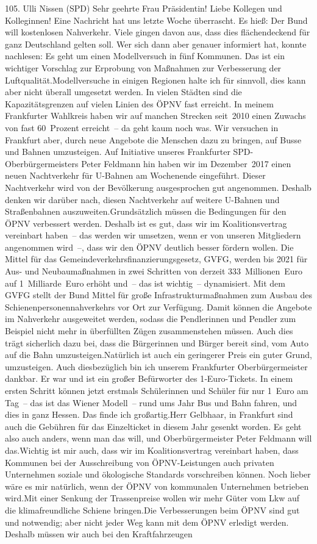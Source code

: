 \documentclass{article}
\begin{document}
	105. Ulli Nissen (SPD) Sehr geehrte Frau Präsidentin! Liebe Kollegen und Kolleginnen! Eine Nachricht hat uns letzte Woche überrascht. Es hieß: Der Bund will kostenlosen Nahverkehr. Viele gingen davon aus, dass dies flächendeckend für ganz Deutschland gelten soll. Wer sich dann aber genauer informiert hat, konnte nachlesen: Es geht um einen Modellversuch in fünf Kommunen. Das ist ein wichtiger Vorschlag zur Erprobung von Maßnahmen zur Verbesserung der Luftqualität.Modellversuche in einigen Regionen halte ich für sinnvoll, dies kann aber nicht überall umgesetzt werden. In vielen Städten sind die Kapazitätsgrenzen auf vielen Linien des ÖPNV fast erreicht. In meinem Frankfurter Wahlkreis haben wir auf manchen Strecken seit 2010 einen Zuwachs von fast 60 Prozent erreicht – da geht kaum noch was. Wir versuchen in Frankfurt aber, durch neue Angebote die Menschen dazu zu bringen, auf Busse und Bahnen umzusteigen. Auf Initiative unseres Frankfurter SPD-Oberbürgermeisters Peter Feldmann hin haben wir im Dezember 2017 einen neuen Nachtverkehr für U-Bahnen am Wochenende eingeführt. Dieser Nachtverkehr wird von der Bevölkerung ausgesprochen gut angenommen. Deshalb denken wir darüber nach, diesen Nachtverkehr auf weitere U-Bahnen und Straßenbahnen auszuweiten.Grundsätzlich müssen die Bedingungen für den ÖPNV verbessert werden. Deshalb ist es gut, dass wir im Koalitionsvertrag vereinbart haben – das werden wir umsetzen, wenn er von unseren Mitgliedern angenommen wird –, dass wir den ÖPNV deutlich besser fördern wollen. Die Mittel für das Gemeindeverkehrsfinanzierungsgesetz, GVFG, werden bis 2021 für Aus- und Neubaumaßnahmen in zwei Schritten von derzeit 333 Millionen Euro auf 1 Milliarde Euro erhöht und – das ist wichtig – dynamisiert. Mit dem GVFG stellt der Bund Mittel für große Infrastrukturmaßnahmen zum Ausbau des Schienenpersonennahverkehrs vor Ort zur Verfügung. Damit können die Angebote im Nahverkehr ausgeweitet werden, sodass die Pendlerinnen und Pendler zum Beispiel nicht mehr in überfüllten Zügen zusammenstehen müssen. Auch dies trägt sicherlich dazu bei, dass die Bürgerinnen und Bürger bereit sind, vom Auto auf die Bahn umzusteigen.Natürlich ist auch ein geringerer Preis ein guter Grund, umzusteigen. Auch diesbezüglich bin ich unserem Frankfurter Oberbürgermeister dankbar. Er war und ist ein großer Befürworter des 1‑Euro-Tickets. In einem ersten Schritt können jetzt erstmals Schülerinnen und Schüler für nur 1 Euro am Tag – das ist das Wiener Modell – rund ums Jahr Bus und Bahn fahren, und dies in ganz Hessen. Das finde ich großartig.Herr Gelbhaar, in Frankfurt sind auch die Gebühren für das Einzelticket in diesem Jahr gesenkt worden. Es geht also auch anders, wenn man das will, und Oberbürgermeister Peter Feldmann will das.Wichtig ist mir auch, dass wir im Koalitionsvertrag vereinbart haben, dass Kommunen bei der Ausschreibung von ÖPNV-Leistungen auch privaten Unternehmen soziale und ökologische Standards vorschreiben können. Noch lieber wäre es mir natürlich, wenn der ÖPNV von kommunalen Unternehmen betrieben wird.Mit einer Senkung der Trassenpreise wollen wir mehr Güter vom Lkw auf die klimafreundliche Schiene bringen.Die Verbesserungen beim ÖPNV sind gut und notwendig; aber nicht jeder Weg kann mit dem ÖPNV erledigt werden. Deshalb müssen wir auch bei den Kraftfahrzeugen 
\end{document}
